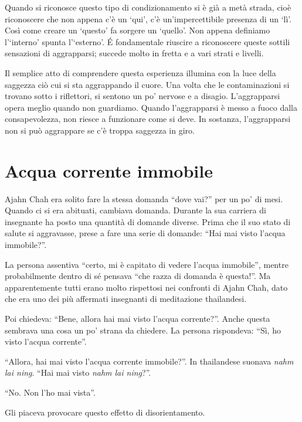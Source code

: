 Quando si riconosce questo tipo di condizionamento si è già a metà strada, cioè riconoscere che non appena c'è un `qui', c'è un'impercettibile presenza di un `lì'. Così come creare un `questo' fa sorgere un `quello'. Non appena definiamo l'`interno' spunta l'`esterno'. É fondamentale riuscire a riconoscere queste sottili sensazioni di aggrapparsi; succede molto in fretta e a vari strati e livelli. 

Il semplice atto di comprendere questa esperienza illumina con la luce della saggezza ciò cui si sta aggrappando il cuore. Una volta che le contaminazioni si trovano sotto i riflettori, si sentono un po' nervose e a disagio. L'aggrapparsi opera meglio quando non guardiamo. Quando l'aggrapparsi è messo a fuoco dalla consapevolezza, non riesce a funzionare come si deve. In sostanza, l'aggrapparsi non si può aggrappare se c'è troppa saggezza in giro.

\section*{Acqua corrente immobile }

Ajahn Chah era solito fare la stessa domanda ``dove vai?'' per un po' di mesi. Quando ci si era abituati, cambiava domanda. Durante la sua carriera di insegnante ha posto una quantità di domande diverse. Prima che il suo stato di salute si aggravasse, prese a fare una serie di domande: ``Hai mai visto l'acqua immobile?''.

La persona assentiva ``certo, mi è capitato di vedere l'acqua immobile'', mentre probabilmente dentro di sé pensava ``che razza di domanda è questa!''. Ma apparentemente tutti erano molto rispettosi nei confronti di Ajahn Chah, dato che era uno dei più affermati insegnanti di meditazione thailandesi. 

Poi chiedeva: ``Bene, allora hai mai visto l'acqua corrente?''. Anche questa sembrava una cosa un po' strana da chiedere. La persona rispondeva: ``Sì, ho visto l'acqua corrente''. 

``Allora, hai mai visto l'acqua corrente immobile?''. In thailandese suonava \textit{nahm lai ning}. ``Hai mai visto \textit{nahm lai ning}?''. 

``No. Non l'ho mai vista''.

Gli piaceva provocare questo effetto di disorientamento.

